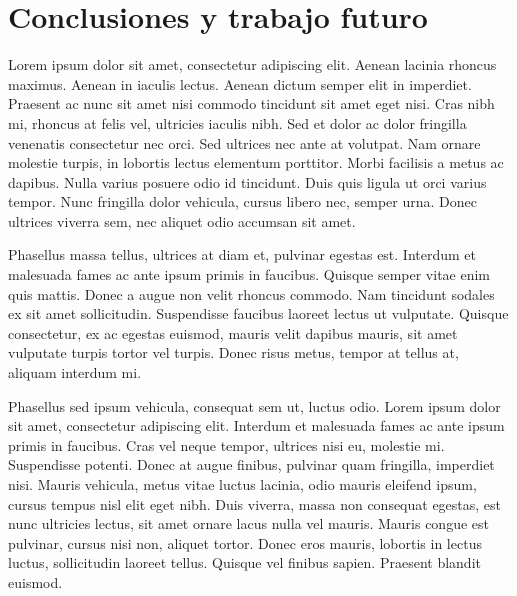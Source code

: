 
\chapter{Conclusiones y trabajo futuro}
\label{chap:Conclusiones}
Lorem ipsum dolor sit amet, consectetur adipiscing elit. Aenean lacinia rhoncus maximus. Aenean in iaculis lectus. Aenean dictum semper elit in imperdiet. Praesent ac nunc sit amet nisi commodo tincidunt sit amet eget nisi. Cras nibh mi, rhoncus at felis vel, ultricies iaculis nibh. Sed et dolor ac dolor fringilla venenatis consectetur nec orci. Sed ultrices nec ante at volutpat. Nam ornare molestie turpis, in lobortis lectus elementum porttitor. Morbi facilisis a metus ac dapibus. Nulla varius posuere odio id tincidunt. Duis quis ligula ut orci varius tempor. Nunc fringilla dolor vehicula, cursus libero nec, semper urna. Donec ultrices viverra sem, nec aliquet odio accumsan sit amet.

Phasellus massa tellus, ultrices at diam et, pulvinar egestas est. Interdum et malesuada fames ac ante ipsum primis in faucibus. Quisque semper vitae enim quis mattis. Donec a augue non velit rhoncus commodo. Nam tincidunt sodales ex sit amet sollicitudin. Suspendisse faucibus laoreet lectus ut vulputate. Quisque consectetur, ex ac egestas euismod, mauris velit dapibus mauris, sit amet vulputate turpis tortor vel turpis. Donec risus metus, tempor at tellus at, aliquam interdum mi.

Phasellus sed ipsum vehicula, consequat sem ut, luctus odio. Lorem ipsum dolor sit amet, consectetur adipiscing elit. Interdum et malesuada fames ac ante ipsum primis in faucibus. Cras vel neque tempor, ultrices nisi eu, molestie mi. Suspendisse potenti. Donec at augue finibus, pulvinar quam fringilla, imperdiet nisi. Mauris vehicula, metus vitae luctus lacinia, odio mauris eleifend ipsum, cursus tempus nisl elit eget nibh. Duis viverra, massa non consequat egestas, est nunc ultricies lectus, sit amet ornare lacus nulla vel mauris. Mauris congue est pulvinar, cursus nisi non, aliquet tortor. Donec eros mauris, lobortis in lectus luctus, sollicitudin laoreet tellus. Quisque vel finibus sapien. Praesent blandit euismod.

